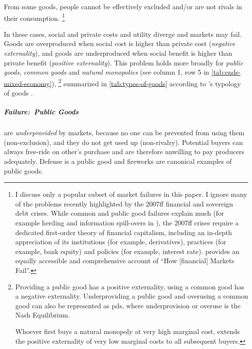 From some goods, people cannot be effectively excluded and/or are not rivals in their consumption.
\footnote{
	I discuss only a popular subset of market failures in this paper.
	I ignore many of the problems recently highlighted by the 2007ff financial and sovereign debt crises.
	While common and public good failures explain much (for example herding and information spill-overs in \citealt{Banerjee-1992-aa}), the 2007ff crises require a dedicated first-order theory of financial capitalism, including an in-depth appreciation of its institutions (for example, derivatives), practices (for example, bank equity) and policies (for example, interest rate).
	\cite{Cassidy2010} provides an equally accessible and comprehensive account of ``How [financial] Markets Fail''.
}

In these cases, social and private costs and utility diverge and markets may fail.
Goods are overproduced when social cost is higher than private cost (\emph{negative externality}), and goods are underproduced when social benefit is higher than private benefit (\emph{positive externality}).
This problem holds more broadly for \emph{public goods}, \emph{common goods} and \emph{natural monopolies} (see column 1, row 5 in \autoref{tab:ends-mixed-economy}),
\footnote{
	Providing a public good has a positive externality, using a common good has a negative externality.
	Underproviding a public good and overusing a common good can also be represented as \glspl{pd}, where underprovision or overuse is the Nash Equilibrium.

	Whoever first buys a natural monopoly at very high marginal cost, extends the positive externality of very low marginal costs to all subsequent buyers.
}
summarized in \autoref{tab:types-of-goods} according to \citeauthor{Samuelson-1954-eu}'s typology of goods \citeyearpar{Samuelson-1954-eu}.



\subparagraph{Failure:\ Public Goods}
	\label{sec:public-good}
are \emph{underprovided} by markets, because no one can be prevented from using them (non-exclusion), and they do not get used up (non-rivalry).
Potential buyers can always free-ride on other's purchase and are therefore unwilling to pay producers adequately.
Defense is a public good and fireworks are canonical examples of public goods.

